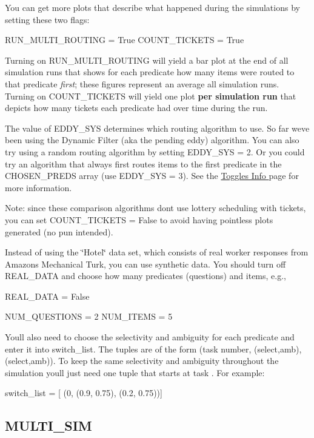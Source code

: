 \begin{DoxyItemize}
\item You can get more plots that describe what happened during the simulations by setting these two flags\+: \begin{DoxyVerb}RUN_MULTI_ROUTING = True
COUNT_TICKETS = True
\end{DoxyVerb}


Turning on {\ttfamily R\+U\+N\+\_\+\+M\+U\+L\+T\+I\+\_\+\+R\+O\+U\+T\+I\+NG} will yield a bar plot at the end of all simulation runs that shows for each predicate how many items were routed to that predicate {\itshape first}; these figures represent an average all simulation runs. Turning on {\ttfamily C\+O\+U\+N\+T\+\_\+\+T\+I\+C\+K\+E\+TS} will yield one plot {\bfseries per simulation run} that depicts how many tickets each predicate had over time during the run.
\item The value of {\ttfamily E\+D\+D\+Y\+\_\+\+S\+YS} determines which routing algorithm to use. So far we\textquotesingle{}ve been using the Dynamic Filter (aka the pending eddy) algorithm. You can also try using a random routing algorithm by setting {\ttfamily E\+D\+D\+Y\+\_\+\+S\+YS = 2}. Or you could try an algorithm that always first routes items to the first predicate in the C\+H\+O\+S\+E\+N\+\_\+\+P\+R\+E\+DS array (use {\ttfamily E\+D\+D\+Y\+\_\+\+S\+YS = 3}). See the \hyperlink{toggles}{Toggles Info } page for more information.

Note\+: since these comparison algorithms don\textquotesingle{}t use lottery scheduling with tickets, you can set {\ttfamily C\+O\+U\+N\+T\+\_\+\+T\+I\+C\+K\+E\+TS = False} to avoid having pointless plots generated (no pun intended).
\item Instead of using the \char`\"{}\+Hotel\char`\"{} data set, which consists of real worker responses from Amazon\textquotesingle{}s Mechanical Turk, you can use synthetic data. You should turn off {\ttfamily R\+E\+A\+L\+\_\+\+D\+A\+TA} and choose how many predicates (questions) and items, e.\+g., \begin{DoxyVerb}REAL_DATA = False

NUM_QUESTIONS = 2
NUM_ITEMS = 5
\end{DoxyVerb}


You\textquotesingle{}ll also need to choose the selectivity and ambiguity for each predicate and enter it into {\ttfamily switch\+\_\+list}. The tuples are of the form {\ttfamily (task number, (select,amb), (select,amb))}. To keep the same selectivity and ambiguity throughout the simulation you\textquotesingle{}ll just need one tuple that starts at task {}. For example\+: \begin{DoxyVerb}switch_list = [ (0, (0.9, 0.75), (0.2, 0.75))]
\end{DoxyVerb}

\end{DoxyItemize}\hypertarget{install_info_MULTI_SIM}{}\subsection{M\+U\+L\+T\+I\+\_\+\+S\+IM}\label{install_info_MULTI_SIM}
